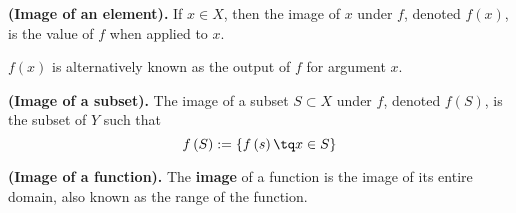 \begin{definition}
    \textbf{(Image of an element).} If $x\in X$, then the image of $x$ under $f$, denoted $f\left( x \right) $, is the value of $f$ when applied to $x$.
\end{definition}
\begin{note}
    $f\left( x \right) $ is alternatively known as the output of $f$ for argument $x$.
\end{note}
\begin{definition}
    \textbf{(Image of a subset).} The image of a subset $S\subset X$ under $f$, denoted $f\left( S \right) $, is the subset of $Y$ such that
    \begin{equation}
        f\left( S \right) := \{f\left( s \right) \tq x\in S\} 
    \end{equation}
\end{definition}
\begin{definition}
    \textbf{(Image of a function).} The \textbf{image} of a function is the image of its entire domain, also known as the range of the function.
\end{definition}


